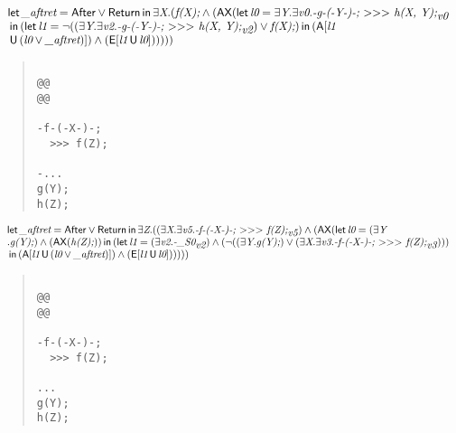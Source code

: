 \documentclass{article}
\newcommand{\U}{\,\mbox{\sf{U}}\,}
\newcommand{\A}{\mbox{\sf{A}}}
\newcommand{\E}{\mbox{\sf{E}}}
\newcommand{\AX}{\mbox{\sf{AX}}}
\newcommand{\mita}[1]{\mbox{\it{{#1}}}}
\newcommand{\msf}[1]{\mbox{\sf{{#1}}}}
\newcommand{\mth}[1]{\({#1}\)}
\begin{document}
\[\begin{array}{l}
\mita{\sf{let}} \, \mita{\_aftret} = \msf{After} \vee \msf{Return} \, \mita{\sf{in}} \, \exists \mita{X} . (\mita{f(X);} \wedge (\AX(\mita{\sf{let}} \, \mita{l0} = \exists \mita{Y} . \exists \mita{v0} . \mita{-g-(-Y-)-;
  \mth{>}\mth{>}\mth{>} h(X, Y);}_{\mita{v0}}\\\mbox{} \, \mita{\sf{in}} \, (\mita{\sf{let}} \, \mita{l1} = \neg ((\exists \mita{Y} . \exists \mita{v2} . \mita{-g-(-Y-)-;
  \mth{>}\mth{>}\mth{>} h(X, Y);}_{\mita{v2}}) \vee \mita{f(X);}) \, \mita{\sf{in}} \, (\A[\mita{l1}\\\mbox{} \U (\mita{l0} \vee \mita{\_aftret})]
) \wedge (\E[\mita{l1} \U \mita{l0}]
)
)
)))

\end{array}\]

\begin{quote}\begin{verbatim}

@@
@@

-f-(-X-)-;
  >>> f(Z);

-...
g(Y);
h(Z);
\end{verbatim}\end{quote}

\[\begin{array}{l}
\mita{\sf{let}} \, \mita{\_aftret} = \msf{After} \vee \msf{Return} \, \mita{\sf{in}} \, \exists \mita{Z} . ((\exists \mita{X} . \exists \mita{v5} . \mita{-f-(-X-)-;
  \mth{>}\mth{>}\mth{>} f(Z);}_{\mita{v5}}) \wedge (\AX(\mita{\sf{let}} \, \mita{l0} = (\exists \mita{Y}\\\mbox{} . \mita{g(Y);}) \wedge (\AX(\mita{h(Z);})) \, \mita{\sf{in}} \, (\mita{\sf{let}} \, \mita{l1} = (\exists \mita{v2} . \mita{-\_S0}_{\mita{v2}}) \wedge (\neg ((\exists \mita{Y} . \mita{g(Y);}) \vee (\exists \mita{X} . \exists \mita{v3} . \mita{-f-(-X-)-;
  \mth{>}\mth{>}\mth{>} f(Z);}_{\mita{v3}})))\\\mbox{} \, \mita{\sf{in}} \, (\A[\mita{l1} \U (\mita{l0} \vee \mita{\_aftret})]
) \wedge (\E[\mita{l1} \U \mita{l0}]
)
)
)))

\end{array}\]

\begin{quote}\begin{verbatim}

@@
@@

-f-(-X-)-;
  >>> f(Z);

...
g(Y);
h(Z);
\end{verbatim}\end{quote}
\end{document}
